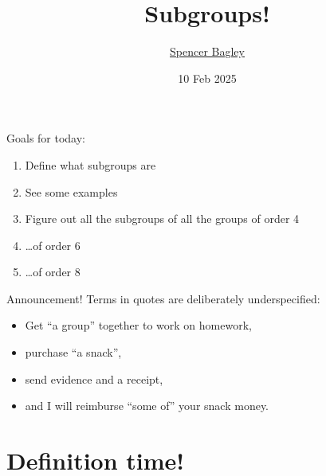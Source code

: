 \documentclass[8pt, handout]{beamer}
\title[Subgroups!]{Subgroups!}
\author[\href{mailto:sbagley@westminsteru.edu}{S. Bagley}]
       {\href{mailto:sbagley@westminsteru.edu}{Spencer Bagley}}
\institute[Westminster] { 
  \normalsize With many thanks to Matthew Macauley, \\
  \url{http://www.math.clemson.edu/~macaule/}}
\date[10 Feb 2025]{10 Feb 2025}
\newcommand{\Pause}{\pause}      %
\begin{document}
\frame{\titlepage}


\begin{frame}{Goals for today:}
  \begin{enumerate}
    \item Define what subgroups are \Pause
    \item See some examples \Pause
    \item Figure out all the subgroups of all the groups of order 4 \Pause
    \item \ldots of order 6 \Pause
    \item \ldots of order 8
  \end{enumerate}
\end{frame}


\begin{frame}{Announcement!}
  Terms in quotes are deliberately underspecified: \Pause
  \begin{itemize}
    \item Get ``a group'' together to work on homework, \Pause
    \item purchase ``a snack'', \Pause
    \item send evidence and a receipt, \Pause
    \item and I will reimburse ``some of'' your snack money.
  \end{itemize}
\end{frame}



\section{Definition time!}
\end{document}
